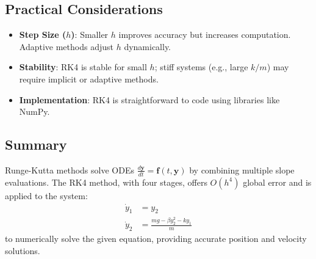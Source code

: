 \documentclass[a4paper,12pt]{article}
\begin{document}
\subsection*{Practical Considerations}
\begin{itemize}
    \item \textbf{Step Size (\(h\))}: Smaller \(h\) improves accuracy but increases computation. Adaptive methods adjust \(h\) dynamically.
    \item \textbf{Stability}: RK4 is stable for small \(h\); stiff systems (e.g., large \(k/m\)) may require implicit or adaptive methods.
    \item \textbf{Implementation}: RK4 is straightforward to code using libraries like NumPy.
\end{itemize}

\subsection*{Summary}
Runge-Kutta methods solve ODEs \(\frac{d\mathbf{y}}{dt} = \mathbf{f}(t, \mathbf{y})\) by combining multiple slope evaluations. The RK4 method, with four stages, offers \(O(h^4)\) global error and is applied to the system:
\begin{align}
\dot{y}_1 &= y_2 \\
\dot{y}_2 &= \frac{mg - \beta y_2^2 - k y_1}{m}
\end{align}
to numerically solve the given equation, providing accurate position and velocity solutions.

\end{document}

